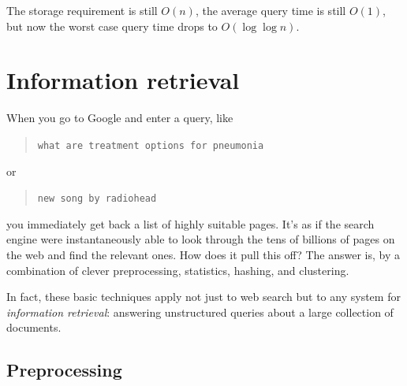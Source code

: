 The storage requirement is still $O(n)$, the average query time is still $O(1)$, but now
the worst case query time drops to $O(\log \log n)$.

\section{Information retrieval}

When you go to Google and enter a query, like
\begin{quote}
{\tt what are treatment options for pneumonia}
\end{quote}
or
\begin{quote}
{\tt new song by radiohead}
\end{quote}
you immediately get back a list of highly suitable pages. It's as if the search engine
were instantaneously able to look through the tens of billions of pages on the web and
find the relevant ones. How does it pull this off? The answer is, by a combination of
clever preprocessing, statistics, hashing, and clustering.

In fact, these basic techniques apply not just to web search but to any system for
{\it information retrieval}: answering unstructured queries about a large collection
of documents.

\subsection{Preprocessing}

